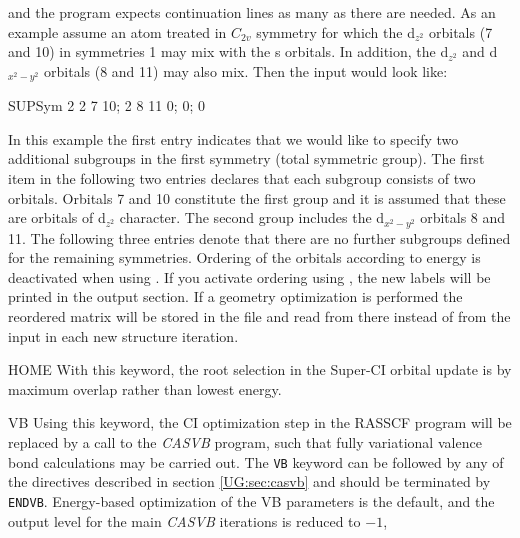 \begin{keywordlist}
and the program expects continuation lines as many as there are needed.
As an example assume an atom treated in $C_{2v}$ symmetry for
which the d$_{z^2}$ orbitals (7 and 10) in symmetries 1 may mix with the
s orbitals. In addition, the d$_{z^2}$ and d$_{x^2-y^2}$ orbitals  (8 and 11)
may also mix. Then the input would look like:
\begin{inputlisting}
SUPSym
2
   2 7 10; 2 8 11
0; 0; 0
\end{inputlisting}
In this example the first entry indicates that we would like to specify
two additional subgroups in the first symmetry (total symmetric group). The
first item in the following two entries declares that each subgroup consists
of two orbitals. Orbitals 7 and 10 constitute the first group and it is
assumed that these are orbitals of d$_{z^2}$ character. The second group
includes the d$_{x^2-y^2}$ orbitals 8 and 11. The following three entries
denote that there are no further subgroups defined for the remaining
symmetries. Ordering of the orbitals according to energy is deactivated
when using . If you activate ordering using ,
the new labels will be printed in the output section.
If a geometry optimization is performed the reordered matrix will be stored
in the  file and read from there instead of from the input
in each new structure iteration.
\item[HOME]
With this keyword, the root selection in the Super-CI orbital update
is by maximum overlap rather than lowest energy.
\item[VB]
\label{vbinrasscf}
Using this keyword, the CI optimization step in the {\rm RASSCF} program will be
replaced by a call to the {\em CASVB} program, such that fully variational valence
bond calculations may be carried out. The {\tt VB} keyword can be followed by any
of the directives described in section \ref{UG:sec:casvb} and should be terminated
by {\tt ENDVB}. Energy-based optimization of the VB parameters is the default,
and the output level for the main {\em CASVB} iterations is reduced to $-1$,

\end{keywordlist}
